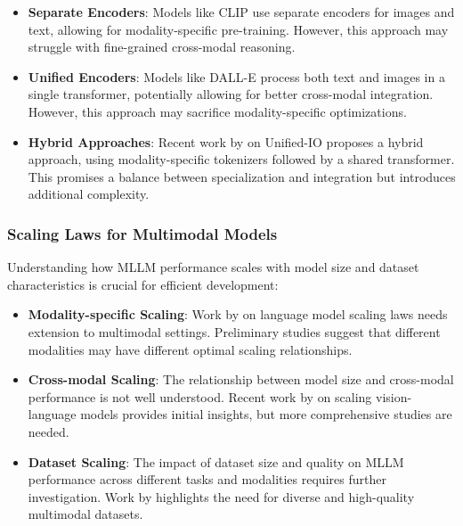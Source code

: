 \begin{itemize}
    \item \textbf{Separate Encoders}: Models like CLIP \citep{radford2021learning} use separate encoders for images and text, allowing for modality-specific pre-training. However, this approach may struggle with fine-grained cross-modal reasoning.
    
    \item \textbf{Unified Encoders}: Models like DALL-E \citep{ramesh2021zero} process both text and images in a single transformer, potentially allowing for better cross-modal integration. However, this approach may sacrifice modality-specific optimizations.
    
    \item \textbf{Hybrid Approaches}: Recent work by \citet{lu2022unified} on Unified-IO proposes a hybrid approach, using modality-specific tokenizers followed by a shared transformer. This promises a balance between specialization and integration but introduces additional complexity.
\end{itemize}

\subsubsection{Scaling Laws for Multimodal Models}
Understanding how MLLM performance scales with model size and dataset characteristics is crucial for efficient development:

\begin{itemize}
    \item \textbf{Modality-specific Scaling}: Work by \citet{kaplan2020scaling} on language model scaling laws needs extension to multimodal settings. Preliminary studies suggest that different modalities may have different optimal scaling relationships.
    
    \item \textbf{Cross-modal Scaling}: The relationship between model size and cross-modal performance is not well understood. Recent work by \citet{zhai2022scaling} on scaling vision-language models provides initial insights, but more comprehensive studies are needed.
    
    \item \textbf{Dataset Scaling}: The impact of dataset size and quality on MLLM performance across different tasks and modalities requires further investigation. Work by \citet{bommasani2021opportunities} highlights the need for diverse and high-quality multimodal datasets.
\end{itemize}

